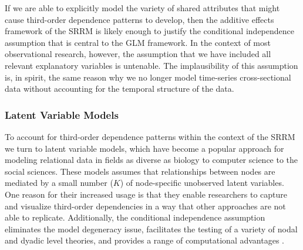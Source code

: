 \documentclass[12pt,pdflatex]{elsarticle}
\newcommand{\pkg}[1]{{\fontseries{b}\selectfont #1}}
\begin{document}
If we are able to explicitly model the variety of shared attributes that might cause third-order dependence patterns to develop, then the additive effects framework of the SRRM is likely enough to justify the conditional independence assumption that is central to the GLM framework. %
In the context of most observational research, however, the assumption that we have included all relevant explanatory variables is untenable. The implausibility of this assumption is, in spirit, the same reason why we no longer model time-series cross-sectional data without accounting for the temporal structure of the data.

\subsubsection{\textbf{Latent Variable Models}}

To account for third-order dependence patterns within the context of the SRRM we turn to latent variable models, which have become a popular approach for modeling relational data in fields as diverse as biology to computer science to the social sciences. These models assumes that relationships between nodes are mediated by a small number ($K$) of node-specific unobserved latent variables. One reason for their increased usage is that they enable researchers to capture and visualize third-order dependencies in a way that other approaches are not able to replicate. Additionally, the conditional independence assumption eliminates the model degeneracy issue, facilitates the testing of a variety of nodal and dyadic level theories, and provides a range of computational advantages \citep{hunter:etal:2012}. 
\end{document}

